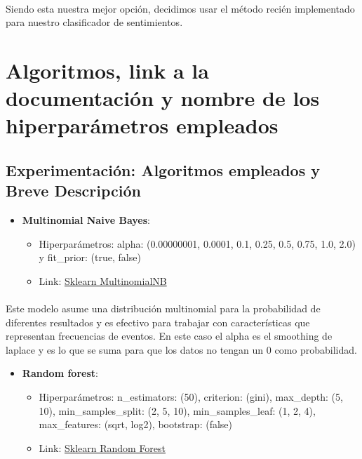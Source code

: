 \documentclass{report}
\begin{document}
{                \paragraph*{}{
                Siendo esta nuestra mejor opción, decidimos usar el método recién implementado para nuestro clasificador de sentimientos.
                }
        \clearpage\section{Algoritmos, link a la documentación y nombre de los hiperparámetros empleados}
            \subsection{Experimentación: Algoritmos empleados y Breve Descripción}
                \begin{itemize}
                    \item \textbf{Multinomial Naive Bayes}:
                    \begin{itemize}
                        \item Hiperparámetros: alpha: (0.00000001, 0.0001, 0.1, 0.25, 0.5, 0.75, 1.0, 2.0) y fit\_prior: (true, false)
                        \item Link: \href{https://scikit-learn.org/stable/modules/generated/sklearn.naive_bayes.MultinomialNB.html}{Sklearn MultinomialNB}
                    \end{itemize}
                \end{itemize}
                \paragraph*{}{
                Este modelo asume una distribución multinomial para la probabilidad de diferentes resultados y es efectivo para trabajar con características que representan frecuencias de eventos. En este caso el alpha es el smoothing de laplace y es lo que se suma para que los datos no tengan un 0 como probabilidad.
                }
                \begin{itemize}
                    \item \textbf{Random forest}:
                    \begin{itemize}
                         \item {Hiperparámetros: n\_estimators: (50), criterion: (gini), max\_depth: (5, 10), min\_samples\_split: (2, 5, 10), min\_samples\_leaf: (1, 2, 4), max\_features: (sqrt, log2), bootstrap: (false) }
                        \item Link: \href{https://scikit-learn.org/stable/modules/generated/sklearn.ensemble.RandomForestClassifier.html}{Sklearn Random Forest}
                    \end{itemize}
                \end{itemize}
}
\end{document}
